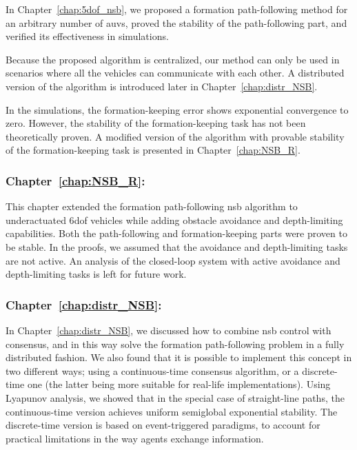 In Chapter~\ref{chap:5dof_nsb}, we proposed a formation path-following method for an arbitrary number of \glspl{auv}, proved the stability of the path-following part, and verified its effectiveness in simulations.

Because the proposed algorithm is centralized, our method can only be used in scenarios where all the vehicles can communicate with each other.
A distributed version of the algorithm is introduced later in Chapter~\ref{chap:distr_NSB}.

In the simulations, the formation-keeping error shows exponential convergence to zero.
However, the stability of the formation-keeping task has not been theoretically proven.
A modified version of the algorithm with provable stability of the formation-keeping task is presented in Chapter~\ref{chap:NSB_R}.

\subsubsection{Chapter~\ref{chap:NSB_R}: }

This chapter extended the formation path-following \gls{nsb} algorithm to underactuated 6\gls{dof} vehicles while adding obstacle avoidance and depth-limiting capabilities. 
Both the path-following and formation-keeping parts were proven to be stable.     
In the proofs, we assumed that the avoidance and depth-limiting tasks are not active.
An analysis of the closed-loop system with active avoidance and depth-limiting tasks is left for future work.

\subsubsection{Chapter~\ref{chap:distr_NSB}: }

In Chapter~\ref{chap:distr_NSB}, we discussed how to combine \acrlong{nsb} control with consensus, and in this way solve the formation path-following problem in a fully distributed fashion. We also found that it is possible to implement this concept in two different ways; using a continuous-time consensus algorithm, or a discrete-time one (the latter being more suitable for real-life implementations).
Using Lyapunov analysis, we showed that in the special case of straight-line paths, the continuous-time version achieves uniform semiglobal exponential stability.
The discrete-time version is based on event-triggered paradigms, to account for practical limitations in the way agents exchange information.

